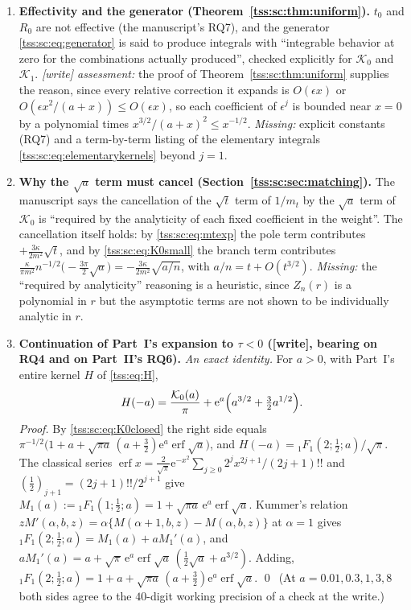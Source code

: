 \documentclass[11pt]{article}
\theoremstyle{remark}\newtheorem{remark}[theorem]{Remark}
\theoremstyle{definition}\newtheorem{definition}[theorem]{Definition}
\newcommand{\e}{\mathrm e}
\begin{document}
\begin{enumerate}[label=\textbf{F\arabic*.},leftmargin=*]
\item \textbf{Effectivity and the generator (Theorem~\ref{tss:sc:thm:uniform}).}
$t_0$ and $R_0$ are not effective (the manuscript's RQ7), and the
generator \eqref{tss:sc:eq:generator} is said to produce integrals with
``integrable behavior at zero for the combinations actually produced'',
checked explicitly for $\mathcal K_0$ and $\mathcal K_1$. \emph{[write]
assessment:} the proof of Theorem~\ref{tss:sc:thm:uniform} supplies the
reason, since every relative correction it expands is $O(\epsilon x)$ or
$O(\epsilon x^2/(a+x))\le O(\epsilon x)$, so each coefficient of
$\epsilon^j$ is bounded near $x=0$ by a polynomial times $x^{3/2}/(a+x)^2\le
x^{-1/2}$. \emph{Missing:} explicit constants (RQ7) and a term-by-term
listing of the elementary integrals \eqref{tss:sc:eq:elementarykernels}
beyond $j=1$.

\item \textbf{Why the $\sqrt a$ term must cancel (Section~\ref{tss:sc:sec:matching}).}
The manuscript says the cancellation of the $\sqrt t$ term of $1/m_t$ by
the $\sqrt a$ term of $\mathcal K_0$ is ``required by the analyticity of
each fixed coefficient in the weight''. The cancellation itself holds: by
\eqref{tss:sc:eq:mtexp} the pole term contributes
$+\frac{3\kappa}{2m^2}\sqrt t$, and by \eqref{tss:sc:eq:K0small} the branch
term contributes
$\frac{\kappa}{\pi m^2}n^{-1/2}\bigl(-\frac{3\pi}2\sqrt a\bigr)
=-\frac{3\kappa}{2m^2}\sqrt{a/n}$, with $a/n=t+O(t^{3/2})$. \emph{Missing:}
the ``required by analyticity'' reasoning is a heuristic, since
$Z_n(r)$ is a polynomial in $r$ but the asymptotic terms are not shown to
be individually analytic in $r$.

\item \textbf{Continuation of Part~I's expansion to $\tau<0$ ([write],
bearing on RQ4 and on Part~II's RQ6).} \emph{An exact identity.} For
$a>0$, with Part~I's entire kernel $H$ of \eqref{tss:eq:H},
\begin{equation}\label{tss:sc:eq:Hreflect}
 H(-a)=\frac{\mathcal K_0(a)}{\pi}
      +\e^a\Bigl(a^{3/2}+\tfrac32a^{1/2}\Bigr).
\end{equation}
\emph{Proof.} By \eqref{tss:sc:eq:K0closed} the right side equals
$\pi^{-1/2}\bigl(1+a+\sqrt{\pi a}\,(a+\frac32)\e^a\operatorname{erf}\sqrt a\bigr)$,
and $H(-a)={}_1F_1(2;\frac12;a)/\sqrt\pi$. The classical series
$\operatorname{erf}x=\frac{2}{\sqrt\pi}\e^{-x^2}\sum_{j\ge0}2^jx^{2j+1}/(2j+1)!!$
and $(\frac12)_{j+1}=(2j+1)!!/2^{j+1}$ give
$M_1(a):={}_1F_1(1;\frac12;a)=1+\sqrt{\pi a}\,\e^a\operatorname{erf}\sqrt a$.
Kummer's relation $zM'(\alpha,b,z)=\alpha\{M(\alpha+1,b,z)-M(\alpha,b,z)\}$
at $\alpha=1$ gives ${}_1F_1(2;\frac12;a)=M_1(a)+aM_1'(a)$, and
$aM_1'(a)=a+\sqrt{\pi}\,\e^a\operatorname{erf}\sqrt a\,(\frac12\sqrt a+a^{3/2})$.
Adding, ${}_1F_1(2;\frac12;a)=1+a+\sqrt{\pi a}\,(a+\frac32)\e^a\operatorname{erf}\sqrt a$.
\qed\ (At $a=0.01,0.3,1,3,8$ both sides agree to the $40$-digit working precision of a check at the write.)


\end{enumerate}
\end{document}
